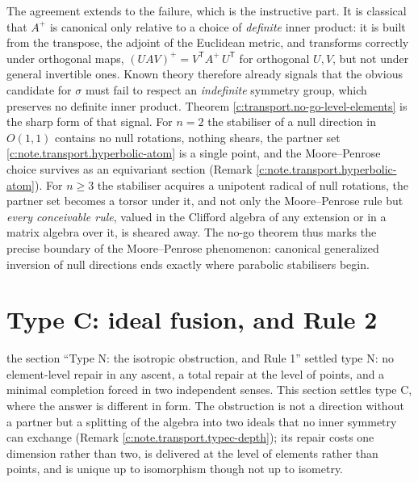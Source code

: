 \documentclass[11pt]{article}
\theoremstyle{definition}
\theoremstyle{plain}
\begin{document}
The agreement extends to the failure, which is the instructive part. It is classical that $A^{+}$ is canonical only relative to a choice of \emph{definite} inner product: it is built from the transpose, the adjoint of the Euclidean metric, and transforms correctly under orthogonal maps, $(UAV)^{+} = V^{\mathsf T} A^{+}\, U^{\mathsf T}$ for orthogonal $U, V$, but not under general invertible ones. Known theory therefore already signals that the obvious candidate for $\sigma$ must fail to respect an \emph{indefinite} symmetry group, which preserves no definite inner product. Theorem \ref{c:transport.no-go-level-elements} is the sharp form of that signal. For $n = 2$ the stabiliser of a null direction in $O(1,1)$ contains no null rotations, nothing shears, the partner set \ref{c:note.transport.hyperbolic-atom} is a single point, and the Moore--Penrose choice survives as an equivariant section (Remark \ref{c:note.transport.hyperbolic-atom}). For $n \geq 3$ the stabiliser acquires a unipotent radical of null rotations, the partner set becomes a torsor under it, and not only the Moore--Penrose rule but \emph{every conceivable rule}, valued in the Clifford algebra of any extension or in a matrix algebra over it, is sheared away. The no-go theorem thus marks the precise boundary of the Moore--Penrose phenomenon: canonical generalized inversion of null directions ends exactly where parabolic stabilisers begin.

\section{Type C: ideal fusion, and Rule 2}

\label{c:note.transport.setting-type-c-ideal-fusion-rule}
the section ``Type N: the isotropic obstruction, and Rule 1'' settled type N: no element-level repair in any ascent, a total repair at the level of points, and a minimal completion forced in two independent senses. This section settles type C, where the answer is different in form. The obstruction is not a direction without a partner but a splitting of the algebra into two ideals that no inner symmetry can exchange (Remark \ref{c:note.transport.typec-depth}); its repair costs one dimension rather than two, is delivered at the level of elements rather than points, and is unique up to isomorphism though not up to isometry.
\end{document}
